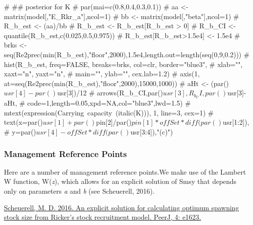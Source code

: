 \documentclass[
  11pt,
]{article}
\newenvironment{Shaded}{}{}
\newcommand{\CommentTok}[1]{\textcolor[rgb]{0.00,0.50,0.00}{#1}}
\begin{document}
\begin{Shaded}
\begin{Highlighting}[]
\CommentTok{# ## posterior for K}
\CommentTok{# par(mai=c(0.8,0.4,0.3,0.1))}
\CommentTok{# aa <- matrix(model[,"E_Rkr_a"],ncol=1)}
\CommentTok{# bb <- matrix(model[,"beta"],ncol=1)}
\CommentTok{# R_b_est <- (aa)/bb}
\CommentTok{# R_b_est <- R_b_est[R_b_est > 0]}
\CommentTok{# R_b_CI <- quantile(R_b_est,c(0.025,0.5,0.975))}
\CommentTok{# R_b_est[R_b_est>1.5e4] <- 1.5e4}
\CommentTok{# brks <- seq(Re2prec(min(R_b_est),"floor",2000),1.5e4,length.out=length(seq(0,9,0.2)))}
\CommentTok{# hist(R_b_est, freq=FALSE, breaks=brks, col=clr, border="blue3",}
\CommentTok{#    xlab="", xaxt="n", yaxt="n",}
\CommentTok{#    main="", ylab="", cex.lab=1.2)}
\CommentTok{# axis(1, at=seq(Re2prec(min(R_b_est),"floor",2000),15000,1000))}
\CommentTok{# aHt <- (par()$usr[4]-par()$usr[3])/12}
\CommentTok{# arrows(R_b_CI,par()$usr[3],R_b_CI,par()$usr[3]-aHt,}
\CommentTok{#        code=1,length=0.05,xpd=NA,col="blue3",lwd=1.5)}
\CommentTok{# mtext(expression(Carrying~capacity~(italic(K))), 1, line=3, cex=1)}
\CommentTok{# text(x=par()$usr[1]+par()$pin[2]/par()$pin[1]*offSet*diff(par()$usr[1:2]),}
\CommentTok{#    y=par()$usr[4]-offSet*diff(par()$usr[3:4]),"(c)")}
\end{Highlighting}
\end{Shaded}

\hypertarget{management-reference-points}{%
\subsubsection{Management Reference
Points}\label{management-reference-points}}

Here are a number of management reference points.We make use of the
Lambert W function, W(\emph{z}), which allows for an explicit solution
of Smsy that depends only on parameters \emph{a} and \emph{b} (see
Scheuerell, 2016).

\href{https://peerj.com/articles/1623/}{Scheuerell, M. D. 2016. An
explicit solution for calculating optimum spawning stock size from
Ricker's stock recruitment model. PeerJ, 4: e1623.}
\end{document}
